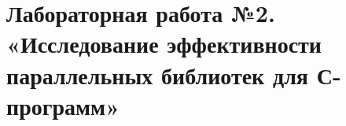 \section{Лабораторная работа №2. «Исследование эффективности параллельных библиотек для С-программ»}




